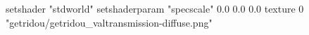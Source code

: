 setshader "stdworld"
setshaderparam "specscale" 0.0 0.0 0.0
texture 0 "getridou/getridou_valtransmission-diffuse.png"